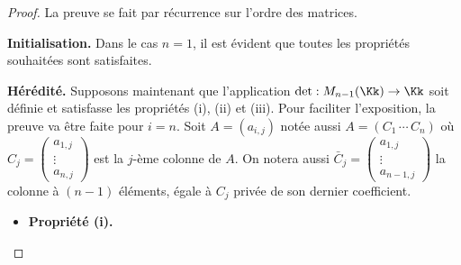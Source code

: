 \documentclass[class=report,crop=false]{standalone}
\begin{document}
\begin{proof}
La preuve se fait par récurrence sur l'ordre des matrices.

\medskip

\textbf{Initialisation.}
Dans le cas $n=1$, il est évident que toutes les propriétés
souhaitées sont satisfaites.

\medskip

\textbf{Hérédité.}
Supposons maintenant que l'application
$\det: M_{n-1}(\Kk) \to \Kk$ soit définie et satisfasse les propriétés
(i), (ii) et (iii). Pour faciliter l'exposition, la preuve va être
faite pour $i=n$. Soit $A=(a_{i,j})$ notée aussi $A=(C_1 \, \cdots \, C_n)$
où $C_j = \left( \begin{smallmatrix} a_{1,j} \\ \vdots \\ a_{n,j} \end{smallmatrix}
\right)$ est la $j$-ème colonne de $A$. On notera aussi
$\bar{C}_j = \left( \begin{smallmatrix} a_{1,j} \\ \vdots \\ a_{n-1,j} \end{smallmatrix}
\right)$ la colonne à $(n-1)$ éléments, égale à $C_j$ privée de son dernier coefficient.

\begin{itemize}
  \item \textbf{Propriété (i).}


\end{itemize}
\end{proof}
\end{document}
